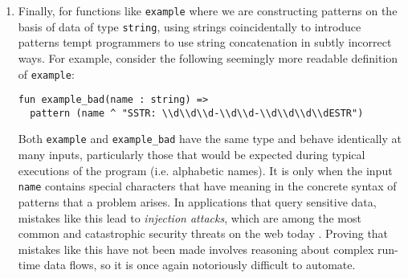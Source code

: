 \begin{enumerate}
\item Finally, for functions like \lstinline{example} where we are constructing patterns on the basis of data of type \lstinline{string}, using strings coincidentally to introduce patterns tempt programmers to use string concatenation in subtly incorrect ways. For example, consider the following seemingly more readable definition of \lstinline{example}:
\begin{lstlisting}[numbers=none,escapechar=|]
fun example_bad(name : string) => 
  pattern (name ^ "SSTR: \\d\\d\\d-\\d\\d-\\d\\d\\d\\dESTR")
\end{lstlisting}

Both \lstinline{example} and \lstinline{example_bad} have the same type and behave identically at many inputs, particularly those that would be expected during typical executions of the program (i.e. alphabetic names). It is only when the input \lstinline{name} contains special characters that have meaning in the concrete syntax of patterns that a problem arises. In applications that query sensitive data, mistakes like this lead to \emph{injection attacks}, which are among the most common and catastrophic security threats on the web today \cite{owasp2013}. Proving that mistakes like this have not been made involves reasoning about complex run-time data flows, so it is once again notoriously difficult to automate. 

\end{enumerate}


